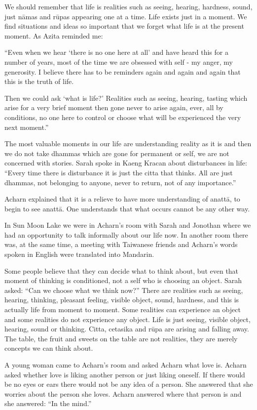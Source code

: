 \documentclass{book}
\begin{document}
We should remember that life is realities such as seeing,
hearing, hardness, sound, just nāmas and rūpas appearing one at a time.
Life exists just in a moment. We find situations and ideas so important
that we forget what life is at the present moment. As Azita reminded me:


``Even when we hear
`there is no one here at
all' and have heard this for a number of years,
most of the time we are obsessed with
self - my anger, my generosity. I believe there has to be reminders
again and again and again that this is the truth of life. 

Then we could ask
`what is life?' Realities
such as seeing, hearing, tasting which arise for a very brief moment
then gone never to arise again, ever, all by conditions, no
one here to control or choose what will
be experienced the very next
moment.''

The most valuable moments in our life are
understanding reality as it is and then we do not take dhammas which are
gone for permanent or self, we are not concerned with stories. 
Sarah spoke in Kaeng Kracan about disturbances in life:
``Every time there is disturbance it is just the citta that thinks. All
are just dhammas, not belonging to anyone, never to return, not of any
importance.'' 

Acharn explained that it is a relieve to have more
understanding of anattā, to begin to see anattā. One understands that
what occurs cannot be any other way.

In Sun Moon Lake we were in Acharn's room with Sarah and
Jonothan where we had an opportunity to talk informally about our life
now. In another room there was, at the same time, a meeting with
Taiwanese friends and Acharn's words spoken in English were translated
into Mandarin. 

Some people believe that they can decide what to think about,
but even that moment of thinking is conditioned, not a self who is
choosing an object. Sarah asked: ``Can we choose what we think now?''
There are realities such as seeing, hearing, thinking, pleasant feeling,
visible object, sound, hardness, and this is actually life from moment
to moment. Some realities can experience an object and some realities do
not experience any object. Life is just seeing, visible object, hearing,
sound or thinking. Citta, cetasika and rūpa are arising and falling
away. The table, the fruit and sweets on the table are not realities,
they are merely concepts we can think about. 

A young woman came to Acharn's room and asked Acharn what
love is. Acharn asked whether love is liking another person or just
liking oneself. If there would be no eyes or ears there would not be any
idea of a person. She answered that she worries about the person she
loves. Acharn answered where that person is and she answered: ``In the
mind.'' 
\end{document}
